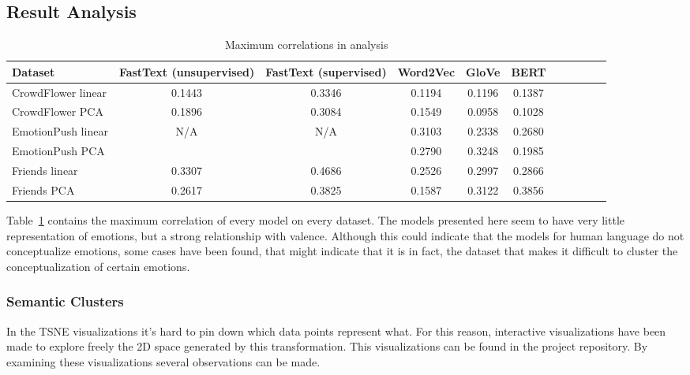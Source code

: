 \subsection{Result Analysis}\label{sub:Result Analysis}
\begin{table}
  \begin{tabular}{|l|c|c|c|c|c|c|c|c|c|c|}
    \hline
    Dataset            & FastText (unsupervised) & FastText (supervised) & Word2Vec & GloVe  & BERT   \\
    \hline
    CrowdFlower linear & 0.1443                  & 0.3346                & 0.1194   & 0.1196 & 0.1387 \\
    CrowdFlower PCA    & 0.1896                  & 0.3084                & 0.1549   & 0.0958 & 0.1028 \\
    EmotionPush linear & N/A                     & N/A                   & 0.3103   & 0.2338 & 0.2680 \\
    EmotionPush PCA    &                         &                       & 0.2790   & 0.3248 & 0.1985 \\
    Friends linear     & 0.3307                  & 0.4686                & 0.2526   & 0.2997 & 0.2866 \\
    Friends PCA        & 0.2617                  & 0.3825                & 0.1587   & 0.3122 & 0.3856 \\
    \hline
  \end{tabular}
  \caption{Maximum correlations in analysis}\label{tab:summary}
\end{table}
Table~\ref{tab:summary} contains the maximum correlation of every model on every dataset. The models presented here seem to have very little representation of emotions, but a strong relationship with valence. Although this could indicate that the models for human language do not conceptualize emotions, some cases have been found, that might indicate that it is in fact, the dataset that makes it difficult to cluster the conceptualization of certain emotions.

\subsubsection{Semantic Clusters}
In the TSNE visualizations it's hard to pin down which data points represent what. For this reason, interactive visualizations have been made to explore freely the 2D space generated by this transformation. This visualizations can be found in the project repository. By examining these visualizations several observations can be made.

